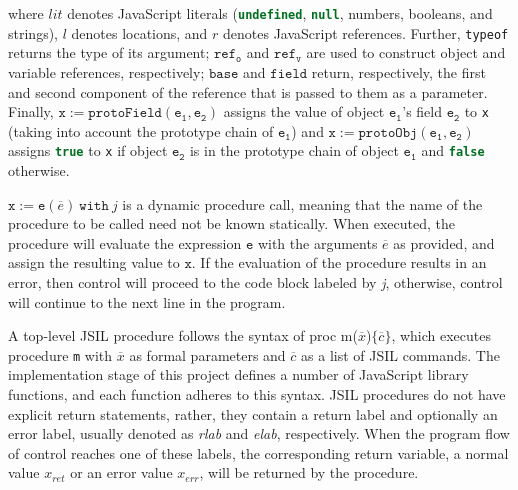 \documentclass[a4paper,11pt,twoside]{report}
\def\jsinline{\lstinline[language=JavaScript, basicstyle=\small]}%\end{lstlisting}
\begin{document}
\noindent where $lit$ denotes JavaScript literals (\jsinline|undefined|, \jsinline|null|, numbers, booleans, and strings), $l$ denotes locations, and $r$ denotes JavaScript references. Further, \texttt{typeof} returns the type of its argument; $\mathtt{ref_o}$ and $\mathtt{ref_v}$ are used to construct object and variable references, respectively; $\mathtt{base}$ and $\mathtt{field}$ return, respectively, the first and second component of the reference that is passed to them as a parameter. Finally, $\mathtt{x := protoField(e_1, e_2)}$ assigns the value of object $\mathtt{e_1}$'s field $\mathtt{e_2}$ to \texttt{x} (taking into account the prototype chain of $\mathtt{e_1}$) and $\mathtt{x := protoObj(e_1, e_2)}$ assigns \jsinline|true| to \texttt{x} if object $\mathtt{e_2}$ is in the prototype chain of object $\mathtt{e_1}$ and \jsinline|false| otherwise.

$\mathtt{x} := \mathtt{e}(\overline{e})\ \mathtt{with}\ \textit{j}$ is a dynamic procedure call, meaning that the name of the procedure to be called need not be known statically. When executed, the procedure will evaluate the expression $\mathtt{e}$ with the arguments $\overline{e}$ as provided, and assign the resulting value to $\mathtt{x}$. If the evaluation of the procedure results in an error, then control will proceed to the code block labeled by \textit{j}, otherwise, control will continue to the next line in the program. 

A top-level JSIL procedure follows the syntax of proc m($\overline{x}$)$\{\overline{c}\}$, which executes procedure \texttt{m} with $\overline{x}$ as formal parameters and $\overline{c}$ as a list of JSIL commands. The implementation stage of this project defines a number of JavaScript library functions, and each function adheres to this syntax. JSIL procedures do not have explicit return statements, rather, they contain a return label and optionally an error label, usually denoted as \textit{rlab} and \textit{elab}, respectively. When the program flow of control reaches one of these labels, the corresponding return variable, a normal value $x_{ret}$ or an error value $x_{err}$, will be returned by the procedure.
\end{document}
